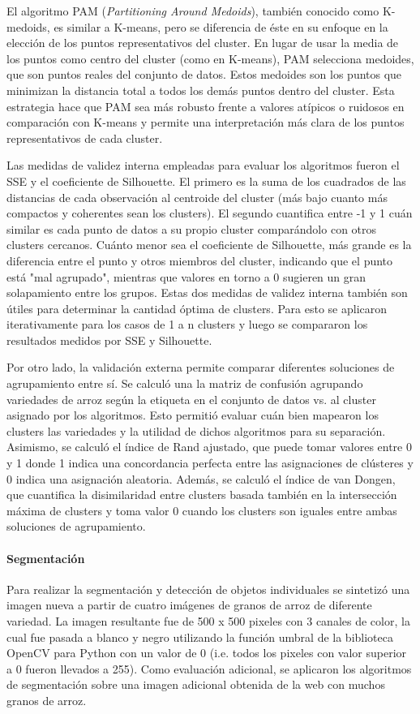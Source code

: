 \documentclass{article}
\begin{document}
El algoritmo PAM (\textit{Partitioning Around Medoids}), también conocido como K-medoids, es similar a K-means, pero se diferencia de éste en su enfoque en la elección de los puntos representativos del cluster.
En lugar de usar la media de los puntos como centro del cluster (como en K-means), PAM selecciona medoides, que son puntos reales del conjunto de datos.
Estos medoides son los puntos que minimizan la distancia total a todos los demás puntos dentro del cluster.
Esta estrategia hace que PAM sea más robusto frente a valores atípicos o ruidosos en comparación con K-means y permite una interpretación más clara de los puntos representativos de cada cluster.

Las medidas de validez interna empleadas para evaluar los algoritmos fueron el SSE y el coeficiente de Silhouette.
El primero es la suma de los cuadrados de las distancias de cada observación al centroide del cluster (más bajo cuanto más compactos y coherentes sean los clusters). 
El segundo cuantifica entre -1 y 1 cuán similar es cada punto de datos a su propio cluster comparándolo con otros clusters cercanos.
Cuánto menor sea el coeficiente de Silhouette, más grande es la diferencia entre el punto y otros miembros del cluster, indicando que el punto está "mal agrupado", mientras que valores en torno a 0 sugieren un gran solapamiento entre los grupos.
Estas dos medidas de validez interna también son útiles para determinar la cantidad óptima de clusters.
Para esto se aplicaron iterativamente para los casos de 1 a n clusters y luego se compararon los resultados medidos por SSE y Silhouette. 

Por otro lado, la validación externa permite comparar diferentes soluciones de agrupamiento entre sí. Se calculó una la matriz de confusión agrupando variedades de arroz según la etiqueta en el conjunto de datos vs. al cluster asignado por los algoritmos.
Esto permitió evaluar cuán bien mapearon los clusters las variedades y la utilidad de dichos algoritmos para su separación. Asimismo, se calculó el índice de Rand ajustado, que puede tomar valores entre 0 y 1 donde 1 indica una concordancia perfecta entre las asignaciones de clústeres y 0 indica una asignación aleatoria. Además, se calculó el índice de van Dongen, que cuantifica la disimilaridad entre clusters basada también en la intersección máxima de clusters y toma valor 0 cuando los clusters son iguales entre ambas soluciones de agrupamiento.


\paragraph{Segmentación}
Para realizar la segmentación y detección de objetos individuales se sintetizó una imagen nueva a partir de cuatro imágenes de granos de arroz de diferente variedad. 
La imagen resultante fue de 500 x 500 pixeles con 3 canales de color, la cual fue pasada a blanco y negro utilizando la función umbral de la biblioteca OpenCV para Python con un valor de 0 (i.e. todos los pixeles con valor superior a 0 fueron llevados a 255).
Como evaluación adicional, se aplicaron los algoritmos de segmentación sobre una imagen adicional obtenida de la web con muchos granos de arroz.
\end{document}
